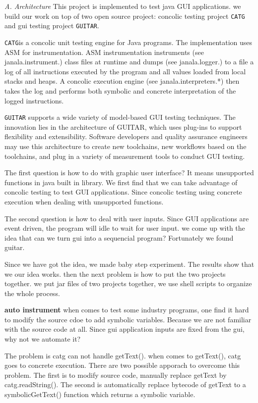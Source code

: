 \documentclass{article}
\begin{document}
\par{\textit{A. Architecture}}
This project is implemented to test java GUI applications.
we build our work on top of two open source project: concolic testing project  \texttt{CATG} and gui testing project \texttt{GUITAR}.

\texttt{CATG}is a concolic unit testing engine for Java programs. The implementation uses ASM for instrumentation. ASM instrumentation instruments (see janala.instrument.) class files at runtime and dumps (see janala.logger.) to a file a log of all instructions executed by the program and all values loaded from local stacks and heaps. A concolic execution engine (see janala.interpreters.*) then takes the log and performs both symbolic and concrete interpretation of the logged instructions.

\texttt{GUITAR} supports a wide variety of model-based GUI testing techniques. The innovation lies in the architecture of GUITAR, which uses plug-ins to support flexibility and extensibility. Software developers and quality assurance engineers may use this architecture to create new toolchains, new workflows based on the toolchains, and plug in a variety of measurement tools to conduct GUI testing.

The first question is how to do with graphic user interface? It means unsupported functions in java built in library.
We first find that we can take advantage of concolic testing to test GUI applications. Since concolic testing using concrete execution when dealing with unsupported functions.

The second question is how to deal with user inputs. Since GUI applications are event driven, the program will idle to wait for user input. we come up with the idea that can we turn gui into a sequencial program? Fortunately we found guitar.

Since we have got the idea, we made baby step experiment. The results show that we our idea works. then the next problem is how to put the two projects together. we put jar files of two projects together, we use shell scripts to organize the whole process.

\textbf{auto instrument} when comes to test some industry programs, one find it hard to modify the source cdoe to add symbolic variables. Because we are not familiar with the source code at all. Since gui application inputs are fixed from the gui, why not we automate it?

The problem is catg can not handle getText(). when comes to getText(), catg goes to concrete execution. There are two possible apporach to overcome this problem. The first is to modify source code, manually replace getText by catg.readString(). The second is automatically replace bytecode of getText to a symbolicGetText() function which returns a symbolic variable.
\end{document}
